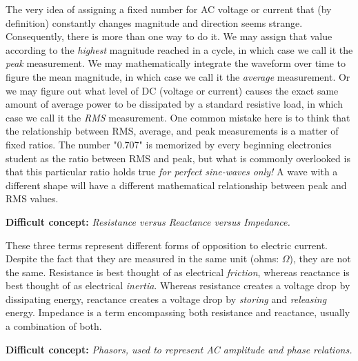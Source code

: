 The very idea of assigning a fixed number for AC voltage or current that (by definition) constantly changes magnitude and direction seems strange.  Consequently, there is more than one way to do it.  We may assign that value according to the {\it highest} magnitude reached in a cycle, in which case we call it the {\it peak} measurement.  We may mathematically integrate the waveform over time to figure the mean magnitude, in which case we call it the {\it average} measurement.  Or we may figure out what level of DC (voltage or current) causes the exact same amount of average power to be dissipated by a standard resistive load, in which case we call it the {\it RMS} measurement.  One common mistake here is to think that the relationship between RMS, average, and peak measurements is a matter of fixed ratios.  The number "0.707" is memorized by every beginning electronics student as the ratio between RMS and peak, but what is commonly overlooked is that this particular ratio holds true {\it for perfect sine-waves only!}  A wave with a different shape will have a different mathematical relationship between peak and RMS values.

\vskip 10pt

\noindent
{\bf Difficult concept: } {\it Resistance versus Reactance versus Impedance.}

These three terms represent different forms of opposition to electric current.  Despite the fact that they are measured in the same unit (ohms: $\Omega$), they are not the same.  Resistance is best thought of as electrical {\it friction}, whereas reactance is best thought of as electrical {\it inertia}.  Whereas resistance creates a voltage drop by dissipating energy, reactance creates a voltage drop by {\it storing} and {\it releasing} energy.  Impedance is a term encompassing both resistance and reactance, usually a combination of both.

\vskip 10pt

\noindent
{\bf Difficult concept: } {\it Phasors, used to represent AC amplitude and phase relations.}

